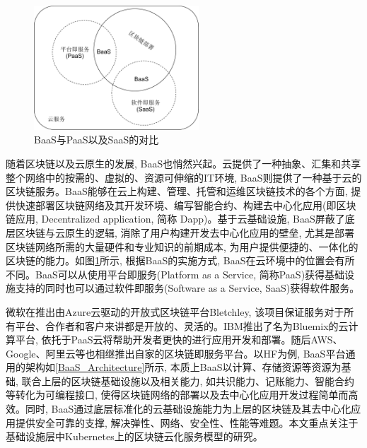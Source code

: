 \begin{figure}[h] %
    \centering %
    \includegraphics[width=0.55\textwidth]{FIGs/chapter2/BaaS_PaaS_SaaS.pdf} %
    \caption{BaaS与PaaS以及SaaS的对比} %
    \label{BaaS_PaaS_SaaS} %
\end{figure}%

随着区块链以及云原生的发展, BaaS也悄然兴起。云提供了一种抽象、汇集和共享整个网络中的按需的、虚拟的、资源可伸缩的IT环境, BaaS则提供了一种基于云的区块链服务。BaaS能够在云上构建、管理、托管和运维区块链技术的各个方面, 提供快速部署区块链网络及其开发环境、编写智能合约、构建去中心化应用(即区块链应用, Decentralized application, 简称 Dapp)。基于云基础设施, BaaS屏蔽了底层区块链与云原生的逻辑, 消除了用户构建开发去中心化应用的壁垒, 尤其是部署区块链网络所需的大量硬件和专业知识的前期成本, 为用户提供便捷的、一体化的区块链的能力。如图\ref{BaaS_PaaS_SaaS}所示, 根据BaaS的实施方式, BaaS在云环境中的位置会有所不同\cite{onik2019performance}。BaaS可以从使用平台即服务(Platform as a Service, 简称PaaS)获得基础设施支持的同时也可以通过软件即服务(Software as a Service, SaaS)获得软件服务。

微软在推出由Azure云驱动的开放式区块链平台Bletchley, 该项目保证服务对于所有平台、合作者和客户来讲都是开放的、灵活的\cite{BlockchainasaServiceNextGenerationofCloudServices}。IBM推出了名为Bluemix的云计算平台, 依托于PaaS云将帮助开发者更快的进行应用开发和部署。随后AWS、Google、阿里云等也相继推出自家的区块链即服务平台。以HF为例, BaaS平台通用的架构如\ref{BaaS_Architecture}所示, 本质上BaaS以计算、存储资源等资源为基础, 联合上层的区块链基础设施以及相关能力, 如共识能力、记账能力、智能合约等转化为可编程接口, 使得区块链网络的部署以及去中心化应用开发过程简单而高效。同时, BaaS通过底层标准化的云基础设施能力为上层的区块链及其去中心化应用提供安全可靠的支撑, 解决弹性、网络、安全性、性能等难题。本文重点关注于基础设施层中Kubernetes上的区块链云化服务模型的研究。

